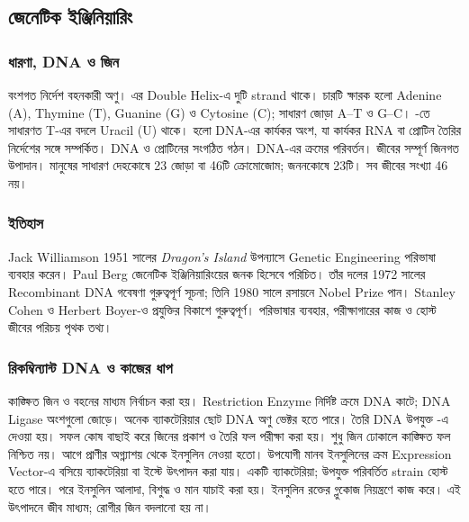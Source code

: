 \subsection{জেনেটিক ইঞ্জিনিয়ারিং}
\label{sec:ch1-genetic}
\subsubsection{ধারণা, DNA ও জিন}
 বংশগত নির্দেশ বহনকারী অণু। এর Double Helix-এ দুটি strand থাকে। চারটি ক্ষারক হলো Adenine (A), Thymine (T), Guanine (G) ও Cytosine (C); সাধারণ জোড়া A--T ও G--C। -তে সাধারণত T-এর বদলে Uracil (U) থাকে।
 হলো DNA-এর কার্যকর অংশ, যা কার্যকর RNA বা প্রোটিন তৈরির নির্দেশের সঙ্গে সম্পর্কিত।  DNA ও প্রোটিনের সংগঠিত গঠন।  DNA-এর ক্রমের পরিবর্তন।  জীবের সম্পূর্ণ জিনগত উপাদান। মানুষের সাধারণ দেহকোষে 23 জোড়া বা 46টি ক্রোমোজোম; জননকোষে 23টি। সব জীবের সংখ্যা 46 নয়।
\subsubsection{ইতিহাস}
Jack Williamson 1951 সালের \textit{Dragon's Island} উপন্যাসে Genetic Engineering পরিভাষা ব্যবহার করেন। Paul Berg জেনেটিক ইঞ্জিনিয়ারিংয়ের জনক হিসেবে পরিচিত। তাঁর দলের 1972 সালের Recombinant DNA গবেষণা গুরুত্বপূর্ণ সূচনা; তিনি 1980 সালে রসায়নে Nobel Prize পান। Stanley Cohen ও Herbert Boyer-ও প্রযুক্তির বিকাশে গুরুত্বপূর্ণ। পরিভাষার ব্যবহার, পরীক্ষাগারের কাজ ও হোস্ট জীবের পরিচয় পৃথক তথ্য।
\subsubsection{রিকম্বিন্যান্ট DNA ও কাজের ধাপ}
কাঙ্ক্ষিত জিন ও বহনের মাধ্যম  নির্বাচন করা হয়। Restriction Enzyme নির্দিষ্ট ক্রমে DNA কাটে; DNA Ligase অংশগুলো জোড়ে। অনেক ব্যাকটেরিয়ার ছোট DNA অণু  ভেক্টর হতে পারে। তৈরি DNA উপযুক্ত -এ দেওয়া হয়। সফল কোষ বাছাই করে জিনের প্রকাশ ও তৈরি ফল পরীক্ষা করা হয়। শুধু জিন ঢোকালে কাঙ্ক্ষিত ফল নিশ্চিত নয়।
আগে প্রাণীর অগ্ন্যাশয় থেকে ইনসুলিন নেওয়া হতো। উপযোগী মানব ইনসুলিনের ক্রম Expression Vector-এ বসিয়ে ব্যাকটেরিয়া বা ইস্টে উৎপাদন করা যায়।  একটি ব্যাকটেরিয়া; উপযুক্ত পরিবর্তিত strain হোস্ট হতে পারে। পরে ইনসুলিন আলাদা, বিশুদ্ধ ও মান যাচাই করা হয়। ইনসুলিন রক্তের গ্লুকোজ নিয়ন্ত্রণে কাজ করে। এই উৎপাদনে জীব মাধ্যম; রোগীর জিন বদলানো হয় না।
